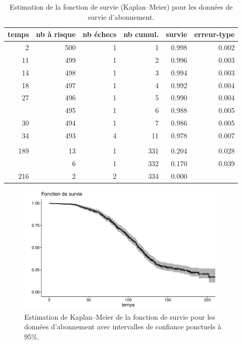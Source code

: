 \documentclass[
  11pt,
  letterpaper,
]{scrbook}
\theoremstyle{definition}
\theoremstyle{remark}
\begin{document}
\hypertarget{tbl-survie1-tableau}{}
\begin{table}
\caption{\label{tbl-survie1-tableau}Estimation de la fonction de survie (Kaplan--Meier) pour les données de
survie d'abonnement. }\tabularnewline

\centering
\begin{tabular}{rrrrrr}
\toprule
temps & nb à risque & nb échecs & nb cumul. & survie & erreur-type\\
\midrule
2 & 500 & 1 & 1 & 0.998 & 0.002\\
11 & 499 & 1 & 2 & 0.996 & 0.003\\
14 & 498 & 1 & 3 & 0.994 & 0.003\\
18 & 497 & 1 & 4 & 0.992 & 0.004\\
27 & 496 & 1 & 5 & 0.990 & 0.004\\
\addlinespace
29 & 495 & 1 & 6 & 0.988 & 0.005\\
30 & 494 & 1 & 7 & 0.986 & 0.005\\
34 & 493 & 4 & 11 & 0.978 & 0.007\\
 &  &  &  &  & \\
189 & 13 & 1 & 331 & 0.204 & 0.028\\
\addlinespace
202 & 6 & 1 & 332 & 0.170 & 0.039\\
216 & 2 & 2 & 334 & 0.000 & \\
\bottomrule
\end{tabular}
\end{table}

\begin{figure}[ht!]

{\centering \includegraphics[width=0.9\textwidth,height=\textheight]{./06-survie_files/figure-pdf/fig-km-survie1-1.pdf}

}

\caption{\label{fig-km-survie1}Estimation de Kaplan--Meier de la
fonction de survie pour les données d'abonnement avec intervalles de
confiance ponctuels à 95\%.}

\end{figure}
\end{document}
